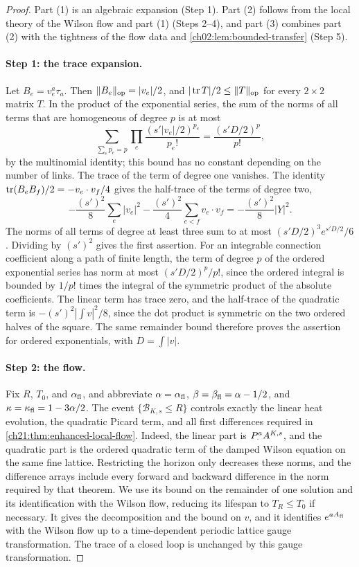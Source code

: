 \begin{proof}
Part (1) is an algebraic expansion (Step 1). Part (2) follows from the local theory of the Wilson flow and part (1) (Steps 2--4), and part (3) combines part (2) with the tightness of the flow data and \cref{ch02:lem:bounded-transfer} (Step 5).

\paragraph{Step 1: the trace expansion.}
Let $B_e=v_e^a\tau_a$. Then $\|B_e\|_{\rm op}=|v_e|/2$, and $|\operatorname{tr} T|/2\le\|T\|_{\rm op}$ for every $2\times2$ matrix $T$. In the product of the exponential series, the sum of the norms of all terms that are homogeneous of degree $p$ is at most
\[
 \sum_{\sum_ep_e=p}\prod_e\frac{(s'|v_e|/2)^{p_e}}{p_e!}=\frac{(s'D/2)^p}{p!},
\]
by the multinomial identity; this bound has no constant depending on the number of links. The trace of the term of degree one vanishes. The identity $\operatorname{tr}(B_eB_f)/2=-v_e\cdot v_f/4$ gives the half-trace of the terms of degree two,
\[
 -\frac{(s')^2}8\sum_e|v_e|^2-\frac{(s')^2}4\sum_{e<f}v_e\cdot v_f=-\frac{(s')^2}8|Y|^2.
\]
The norms of all terms of degree at least three sum to at most $(s'D/2)^3e^{s'D/2}/6$. Dividing by $(s')^2$ gives the first assertion. For an integrable connection coefficient along a path of finite length, the term of degree $p$ of the ordered exponential series has norm at most $(s'D/2)^p/p!$, since the ordered integral is bounded by $1/p!$ times the integral of the symmetric product of the absolute coefficients. The linear term has trace zero, and the half-trace of the quadratic term is $-(s')^2|\int v|^2/8$, since the dot product is symmetric on the two ordered halves of the square. The same remainder bound therefore proves the assertion for ordered exponentials, with $D=\int|v|$.

\paragraph{Step 2: the flow.}
Fix $R$, $T_0$, and $\alpha_{\mathrm{fl}}$, and abbreviate $\alpha=\alpha_{\mathrm{fl}}$, $\beta=\beta_{\mathrm{fl}}=\alpha-1/2$, and $\kappa=\kappa_{\mathrm{fl}}=1-3\alpha/2$. The event $\{\mathcal B_{K,s}\le R\}$ controls exactly the linear heat evolution, the quadratic Picard term, and all first differences required in \cref{ch21:thm:enhanced-local-flow}. Indeed, the linear part is $P_{\cdot}^{a}A^{K,s}$, and the quadratic part is the ordered quadratic term of the damped Wilson equation on the same fine lattice. Restricting the horizon only decreases these norms, and the difference arrays include every forward and backward difference in the norm required by that theorem. We use its bound on the remainder of one solution and its identification with the Wilson flow, reducing its lifespan to $T_R\le T_0$ if necessary. It gives the decomposition and the bound on $v$, and it identifies $e^{aA_{\rm fl}}$ with the Wilson flow up to a time-dependent periodic lattice gauge transformation. The trace of a closed loop is unchanged by this gauge transformation.


\end{proof}
